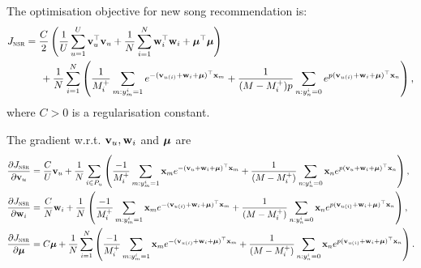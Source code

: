 The optimisation objective for new song recommendation is:
\begin{equation*}
\begin{aligned}
J_\textsc{nsr} &= \frac{C}{2} \left( \frac{1}{U} \sum_{u=1}^U \mathbf{v}_u^\top \mathbf{v}_u 
     + \frac{1}{N} \sum_{i=1}^N \mathbf{w}_i^\top \mathbf{w}_i + \bm{\mu}^\top \bm{\mu} \right) \\
& \hspace{1.5em}
     + \frac{1}{N} \sum_{i=1}^N \left( \frac{1}{M_i^+} \sum_{m: y_m^i = 1} e^{-(\mathbf{v}_{u(i)} + \mathbf{w}_i + \bm{\mu})^\top \mathbf{x}_m} 
     + \frac{1}{(M - M_i^+) p} \sum_{n: y_n^i = 0} e^{p (\mathbf{v}_{u(i)} + \mathbf{w}_i + \bm{\mu})^\top \mathbf{x}_n} \right),
\end{aligned}
\end{equation*}
where $C > 0$ is a regularisation constant.


The gradient w.r.t. $\mathbf{v}_u, \mathbf{w}_i$ and $\bm{\mu}$ are
\begin{equation*}
\begin{aligned}
\frac{\partial J_\textsc{nsr}}{\partial \mathbf{v}_u}
&= \frac{C}{U} \mathbf{v}_u + \frac{1}{N} \sum_{i \in P_u} \left( 
   \frac{-1}{M_i^+} \sum_{m: y_m^i = 1} \mathbf{x}_m e^{-(\mathbf{v}_{u} + \mathbf{w}_i + \bm{\mu})^\top \mathbf{x}_m} 
   + \frac{1}{(M - M_i^+)} \sum_{n: y_n^i = 0} \mathbf{x}_n e^{p (\mathbf{v}_{u} + \mathbf{w}_i + \bm{\mu})^\top \mathbf{x}_n} \right), \\
\frac{\partial J_\textsc{nsr}}{\partial \mathbf{w}_i}
&= \frac{C}{N} \mathbf{w}_i + \frac{1}{N} \left( 
   \frac{-1}{M_i^+} \sum_{m: y_m^i = 1} \mathbf{x}_m e^{-(\mathbf{v}_{u(i)} + \mathbf{w}_i + \bm{\mu})^\top \mathbf{x}_m} 
   + \frac{1}{(M - M_i^+)} \sum_{n: y_n^i = 0} \mathbf{x}_n e^{p (\mathbf{v}_{u(i)} + \mathbf{w}_i + \bm{\mu})^\top \mathbf{x}_n} \right), \\
\frac{\partial J_\textsc{nsr}}{\partial \bm{\mu}}
&= C \bm{\mu} + \frac{1}{N} \sum_{i=1}^N \left( 
   \frac{-1}{M_i^+} \sum_{m: y_m^i = 1} \mathbf{x}_m e^{-(\mathbf{v}_{u(i)} + \mathbf{w}_i + \bm{\mu})^\top \mathbf{x}_m} 
   + \frac{1}{(M - M_i^+)} \sum_{n: y_n^i = 0} \mathbf{x}_n e^{p (\mathbf{v}_{u(i)} + \mathbf{w}_i + \bm{\mu})^\top \mathbf{x}_n} \right).
\end{aligned}
\end{equation*}
